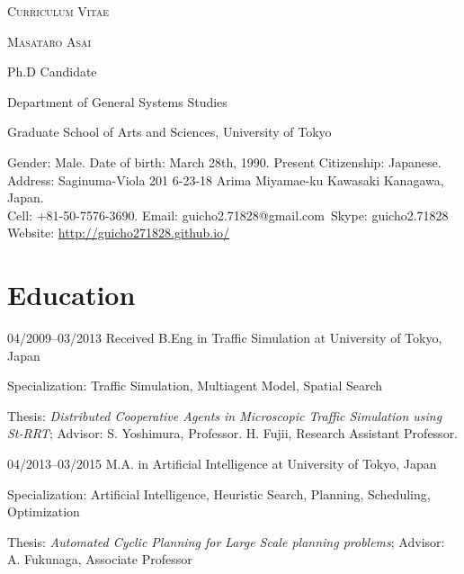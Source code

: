 \documentclass[a4paper]{article}
\begin{document}
\pagestyle{empty}

\begin{center}
\huge{\textsc{Curriculum Vitae}}
\vspace{\baselineskip}

\Large{\textsc{Masataro Asai}}
\vspace{0.5\baselineskip}

\large{
Ph.D Candidate

Department of General Systems Studies

Graduate School of Arts and Sciences, University of Tokyo
}

\vspace{0.8\baselineskip}

\normalsize{
 Gender: Male. Date of birth: March 28th, 1990. Present Citizenship: Japanese. \\
 Address: Saginuma-Viola 201 6-23-18 Arima Miyamae-ku Kawasaki Kanagawa, Japan. \\
 Cell: +81-50-7576-3690. Email: guicho2.71828@gmail.com\ Skype: guicho2.71828\\
 Website: \url{http://guicho271828.github.io/}}
\end{center}


\section{Education}

\begin{CV}
 \item[04/2009--03/2013] Received B.Eng in Traffic Simulation at University of Tokyo, Japan
 
 Specialization: Traffic Simulation, Multiagent Model, Spatial Search
 
 Thesis: \emph{Distributed Cooperative Agents in Microscopic Traffic
 Simulation using St-RRT}; Advisor: S. Yoshimura, Professor. H. Fujii, Research Assistant Professor.

 \item[04/2013--03/2015] M.A. in Artificial Intelligence at University of Tokyo, Japan

 Specialization: Artificial Intelligence, Heuristic Search, Planning, Scheduling, Optimization

 Thesis: \emph{Automated Cyclic Planning for Large Scale planning problems};
 Advisor: A. Fukunaga, Associate Professor
\end{CV}
\end{document}
